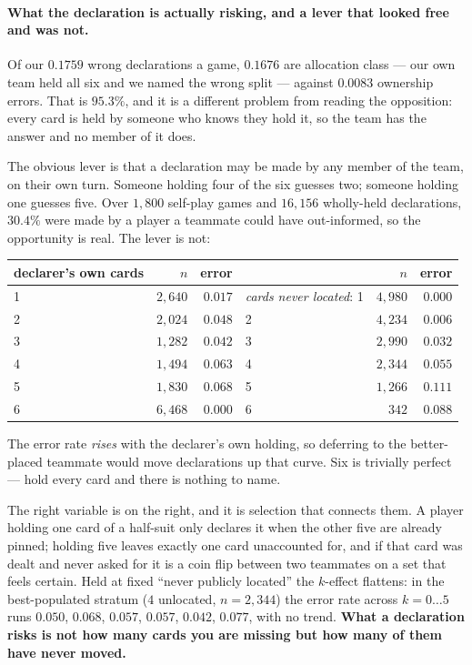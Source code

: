 \documentclass[11pt,a4paper]{article}
\begin{document}
\paragraph{What the declaration is actually risking, and a lever that looked
free and was not.} Of our $0.1759$ wrong declarations a game, $0.1676$ are
allocation class --- our own team held all six and we named the wrong split ---
against $0.0083$ ownership errors. That is $95.3\%$, and it is a different
problem from reading the opposition: every card is held by someone who knows
they hold it, so the team has the answer and no member of it does.

The obvious lever is that a declaration may be made by any member of the team,
on their own turn. Someone holding four of the six guesses two; someone holding
one guesses five. Over $1{,}800$ self-play games and $16{,}156$ wholly-held
declarations, $30.4\%$ were made by a player a teammate could have
out-informed, so the opportunity is real. The lever is not:

\begin{center}
\small
\begin{tabular}{lrrlrr}
\toprule
declarer's own cards & $n$ & error & & $n$ & error \\
\midrule
1 & $2{,}640$ & $0.017$ & \emph{cards never located}: 1 & $4{,}980$ & $0.000$ \\
2 & $2{,}024$ & $0.048$ & \hspace{1em} 2 & $4{,}234$ & $0.006$ \\
3 & $1{,}282$ & $0.042$ & \hspace{1em} 3 & $2{,}990$ & $0.032$ \\
4 & $1{,}494$ & $0.063$ & \hspace{1em} 4 & $2{,}344$ & $0.055$ \\
5 & $1{,}830$ & $\mathbf{0.068}$ & \hspace{1em} 5 & $1{,}266$ & $\mathbf{0.111}$ \\
6 & $6{,}468$ & $0.000$ & \hspace{1em} 6 & $342$ & $0.088$ \\
\bottomrule
\end{tabular}
\end{center}

The error rate \emph{rises} with the declarer's own holding, so deferring to
the better-placed teammate would move declarations up that curve. Six is
trivially perfect --- hold every card and there is nothing to name.

The right variable is on the right, and it is selection that connects them. A
player holding one card of a half-suit only declares it when the other five are
already pinned; holding five leaves exactly one card unaccounted for, and if
that card was dealt and never asked for it is a coin flip between two teammates
on a set that feels certain. Held at fixed ``never publicly located'' the
$k$-effect flattens: in the best-populated stratum ($4$ unlocated, $n=2{,}344$)
the error rate across $k = 0 \ldots 5$ runs $0.050$, $0.068$, $0.057$, $0.057$,
$0.042$, $0.077$, with no trend. \textbf{What a declaration risks is not how
many cards you are missing but how many of them have never moved.}
\end{document}

